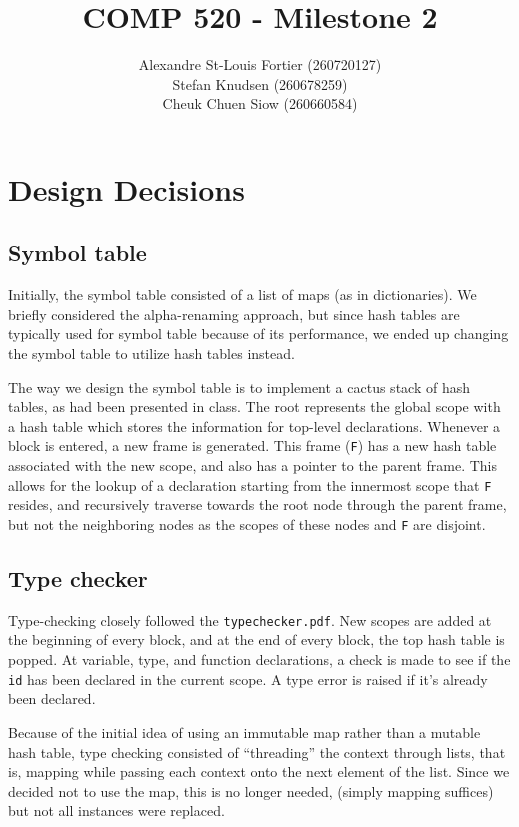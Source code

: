 \documentclass{article}
\begin{document}
\title{COMP 520 - Milestone 2}
\author{
Alexandre St-Louis Fortier (260720127)\\
Stefan Knudsen (260678259)\\
Cheuk Chuen Siow (260660584)}
\maketitle

\raggedright
\section*{Design Decisions}
\subsection*{Symbol table}
Initially, the symbol table consisted of a list of maps (as in dictionaries). We briefly considered the alpha-renaming approach, but since hash tables are typically used for symbol table because of its performance, we ended up changing the symbol table to utilize hash tables instead.

The way we design the symbol table is to implement a cactus stack of hash tables, as had been presented in class. The root represents the global scope with a hash table which stores the information for top-level declarations. Whenever a block is entered, a new frame is generated. This frame (\verb|F|) has a new hash table associated with the new scope, and also has a pointer to the parent frame. This allows for the lookup of a declaration starting from the innermost scope that \verb|F| resides, and recursively traverse towards the root node through the parent frame, but not the neighboring nodes as the scopes of these nodes and \verb|F| are disjoint.

\subsection*{Type checker}
Type-checking closely followed the \verb|typechecker.pdf|. New scopes are added at the beginning of every block, and at the end of every block, the top hash table is popped. At variable, type, and function declarations, a check is made to see if the \verb|id| has been declared in the current scope. A type error is raised if it's already been declared.

Because of the initial idea of using an immutable map rather than a mutable hash table, type checking consisted of ``threading'' the context through lists, that is, mapping while passing each context onto the next element of the list. Since we decided not to use the map, this is no longer needed, (simply mapping suffices) but not all instances were replaced.
\end{document}
